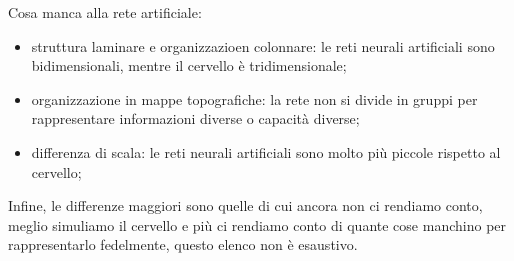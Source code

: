 Cosa manca alla rete artificiale:
\begin{itemize}
\item struttura laminare e organizzazioen colonnare: le reti neurali artificiali
sono bidimensionali, mentre il cervello è tridimensionale;
\item organizzazione in mappe topografiche: la rete non si divide in gruppi per
rappresentare informazioni diverse o capacità diverse;
\item differenza di scala: le reti neurali artificiali sono molto più piccole
rispetto al cervello;
\end{itemize}

Infine, le differenze maggiori sono quelle di cui ancora non ci rendiamo conto,
meglio simuliamo il cervello e più ci rendiamo conto di quante cose manchino per
rappresentarlo fedelmente, questo elenco non è esaustivo.
